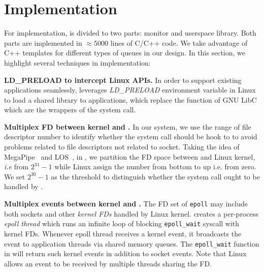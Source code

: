 \section{Implementation}
\label{sec:implementation}

For implementation, \libipc is divided to two parts: monitor and userspace library. Both parts are implemented in $\approx$5000 lines of C/C++ code. We take advantage of C++ templates for different types of queues in our design. %
In this section, we highlight several techniques in implementation:


\textbf{LD\_PRELOAD to intercept Linux APIs.}
In order to support existing applications seamlessly, \libipc leverages \textit{LD\_PRELOAD} environment variable in Linux to load a shared library to applications, which replace the function of GNU LibC which are the wrappers of the system call. 

\textbf{Multiplex FD between kernel and \libipc{}.}
In our system, we use the range of file descriptor number to identify whether the system call should be hook to \libipc to avoid problems related to file descriptors not related to socket. Taking the idea of MegaPipe~\cite{han2012megapipe} and LOS~\cite{huang2017high}, in \libipc, we partition the FD space between \libipc and Linux kernel, \textit{i.e} from $2^{31}-1$ while Linux assign the number from bottom to up i.e. from zero. We set $2^{30} - 1 $ as the threshold to distinguish whether the system call ought to be handled by \libipc.

\textbf{Multiplex events between kernel and \libipc{}.}
The FD set of \texttt{epoll} may include both sockets and other \textit{kernel FDs} handled by Linux kernel.
\libipc{} creates a per-process \textit{epoll thread} which runs an infinite loop of blocking \texttt{epoll\_wait} syscall with kernel FDs. Whenever epoll thread receives a kernel event, it broadcasts the event to application threads via shared memory queues. The \texttt{epoll\_wait} function in \libipc{} will return such kernel events in addition to socket events. Note that Linux allows an event to be received by multiple threads sharing the FD.


